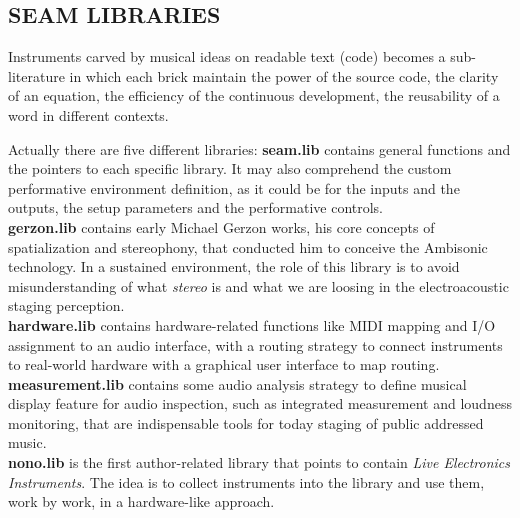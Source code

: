 \documentclass[
	a0,
	portrait
	]{a0poster}
\begin{document}
\begin{multicols}{4}
\section*{\color{cbordeaux}SEAM LIBRARIES}


Instruments carved by musical ideas on readable text (code) becomes a sub-literature in which each brick maintain the power of the source code, the clarity of an equation, the efficiency of the continuous development, the reusability of a word in different contexts. 

Actually there are five different libraries:
\textbf{seam.lib} contains general functions and the pointers to each specific library. It may also comprehend the custom performative environment definition, as it could be for the inputs and the outputs, the setup parameters and the performative controls. \\
\textbf{gerzon.lib} contains early Michael Gerzon works, his core concepts of spatialization and stereophony, that conducted him to conceive the Ambisonic technology. In a sustained environment, the role of this library is to avoid misunderstanding of what \emph{stereo} is and what we are loosing in the electroacoustic staging perception. \\
\textbf{hardware.lib} contains hardware-related functions like MIDI mapping and I/O assignment to an audio interface, with a routing strategy to connect instruments to real-world hardware with a graphical user interface to map routing.\\
\textbf{measurement.lib} contains some audio analysis strategy to define musical display feature for audio inspection, such as integrated measurement and loudness monitoring, that are indispensable tools for today staging of public addressed music.\\
\textbf{nono.lib} is the first author-related library that points to contain \emph{Live Electronics Instruments}. The idea is to collect instruments into the library and use them, work by work, in a hardware-like approach.


\end{multicols}
\end{document}

